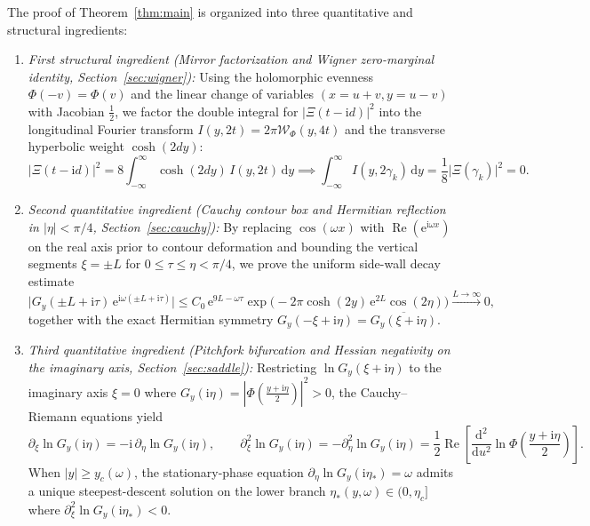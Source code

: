 \documentclass[11pt,a4paper,reqno]{amsart}
\theoremstyle{definition}
\theoremstyle{remark}
\numberwithin{equation}{section}
\newcommand{\dd}{\mathrm{d}}
\newcommand{\ii}{\mathrm{i}}
\newcommand{\ee}{\mathrm{e}}
\newcommand{\Rea}{\operatorname{Re}}
\newcommand{\Wig}{\mathcal{W}}
\begin{document}
The proof of Theorem~\ref{thm:main} is organized into three quantitative and structural ingredients:
\begin{enumerate}
\item \emph{First structural ingredient (Mirror factorization and Wigner zero-marginal identity, Section~\ref{sec:wigner}):} Using the holomorphic evenness $\Phi(-v) = \Phi(v)$ and the linear change of variables $(x=u+v, y=u-v)$ with Jacobian $\frac{1}{2}$, we factor the double integral for $|\Xi(t-\ii d)|^2$ into the longitudinal Fourier transform $I(y,2t) = 2\pi\Wig_\Phi(y,4t)$ and the transverse hyperbolic weight $\cosh(2d y)$:
\begin{equation}\label{eq:ingred1}
\big|\Xi(t-\ii d)\big|^2 = 8\int_{-\infty}^\infty \cosh(2d y)\,I(y,2t)\,\dd y \implies \int_{-\infty}^\infty I(y,2\gamma_k)\,\dd y = \frac{1}{8}\big|\Xi(\gamma_k)\big|^2 = 0.
\end{equation}
\item \emph{Second quantitative ingredient (Cauchy contour box and Hermitian reflection in $|\eta| < \pi/4$, Section~\ref{sec:cauchy}):} By replacing $\cos(\omega x)$ with $\Rea(\ee^{\ii\omega x})$ on the real axis prior to contour deformation and bounding the vertical segments $\xi = \pm L$ for $0 \le \tau \le \eta < \pi/4$, we prove the uniform side-wall decay estimate
\begin{equation}\label{eq:ingred2}
\big|G_y(\pm L + \ii\tau)\,\ee^{\ii\omega(\pm L + \ii\tau)}\big| \le C_0\,\ee^{9L - \omega\tau}\exp\!\Big(-2\pi\cosh(2y)\,\ee^{2L}\cos(2\eta)\Big) \xrightarrow{L\to\infty} 0,
\end{equation}
together with the exact Hermitian symmetry $G_y(-\xi+\ii\eta) = \overline{G_y(\xi+\ii\eta)}$.
\item \emph{Third quantitative ingredient (Pitchfork bifurcation and Hessian negativity on the imaginary axis, Section~\ref{sec:saddle}):} Restricting $\ln G_y(\xi+\ii\eta)$ to the imaginary axis $\xi=0$ where $G_y(\ii\eta) = |\Phi(\frac{y+\ii\eta}{2})|^2 > 0$, the Cauchy--Riemann equations yield
\begin{equation}\label{eq:ingred3}
\partial_\xi \ln G_y(\ii\eta) = -\ii\,\partial_\eta \ln G_y(\ii\eta), \qquad \partial_\xi^2 \ln G_y(\ii\eta) = -\partial_\eta^2 \ln G_y(\ii\eta) = \frac{1}{2}\Rea\!\left[\frac{\dd^2}{\dd u^2}\ln\Phi\!\left(\frac{y+\ii\eta}{2}\right)\right].
\end{equation}
When $|y| \ge y_c(\omega)$, the stationary-phase equation $\partial_\eta \ln G_y(\ii\eta_*) = \omega$ admits a unique steepest-descent solution on the lower branch $\eta_*(y,\omega) \in (0,\eta_c]$ where $\partial_\xi^2 \ln G_y(\ii\eta_*) < 0$.
\end{enumerate}
\end{document}
